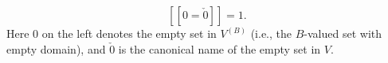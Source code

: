 $$[\![0 = \check{0}]\!] = 1.$$
Here $0$ on the left denotes the empty set in $V^{(B)}$ (i.e., the $B$-valued set with empty domain), and $\check{0}$ is the canonical name of the empty set in $V$.
